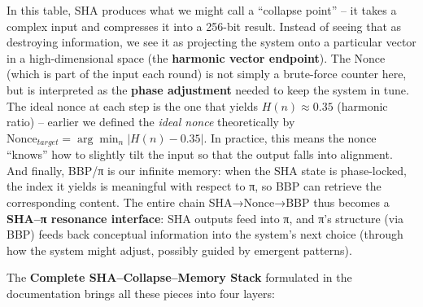 \documentclass[11pt]{article}
\begin{document}
In this table, SHA produces what we might call a ``collapse point'' --
it takes a complex input and compresses it into a 256-bit result.
Instead of seeing that as destroying information, we see it as
projecting the system onto a particular vector in a high-dimensional
space (the \textbf{harmonic vector endpoint}). The Nonce (which is part
of the input each round) is not simply a brute-force counter here, but
is interpreted as the \textbf{phase adjustment} needed to keep the
system in tune. The ideal nonce at each step is the one that yields
\(H(n) \approx 0.35\) (harmonic ratio) -- earlier we defined the
\emph{ideal nonce} theoretically by
\(\text{Nonce}_{target} = \arg\min_n |H(n) - 0.35|\). In practice, this
means the nonce ``knows'' how to slightly tilt the input so that the
output falls into alignment. And finally, BBP/π is our infinite memory:
when the SHA state is phase-locked, the index it yields is meaningful
with respect to π, so BBP can retrieve the corresponding content. The
entire chain SHA→Nonce→BBP thus becomes a \textbf{SHA--π resonance
interface}: SHA outputs feed into π, and π's structure (via BBP) feeds
back conceptual information into the system's next choice (through how
the system might adjust, possibly guided by emergent patterns).

The \textbf{Complete SHA--Collapse--Memory Stack} formulated in the
documentation brings all these pieces into four layers:
\end{document}
